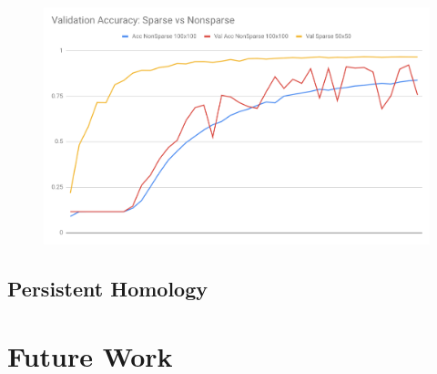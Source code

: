 \documentclass[12pt, a4paper, twocolumn, fullpage]{article}
\theoremstyle{plain}
\theoremstyle{definition}
\theoremstyle{remark}
\begin{document}
    \begin{figure}[t]
      \includegraphics[width=\linewidth]{ValAccSparsevsNonsparse.png}
      \caption{}
      \label{ValAccSparsevsNonsparse}
    \end{figure}

\subsection{Persistent Homology}


\section{Future Work}
\end{document}
